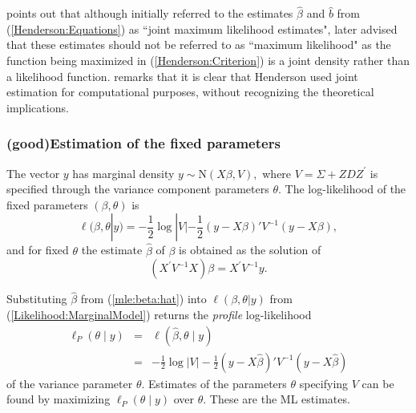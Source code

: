 \documentclass[12pt, a4paper]{report}
\theoremstyle{plain}
\theoremstyle{definition}
\theoremstyle{remark}
\begin{document}
		\cite{Robi:BLUP:1991} points out that although \cite{Henderson:1950} initially referred to the estimates $\hat{\beta}$ and $\hat{b}$ from (\ref{Henderson:Equations}) as ``joint maximum likelihood estimates", \cite{Henderson:1973} later advised that these estimates should not be referred to as ``maximum likelihood" as the function being maximized in (\ref{Henderson:Criterion}) is a joint density rather than a likelihood function. \cite{YLee} remarks that it is clear that Henderson used joint estimation for computational purposes, without recognizing the theoretical implications.
		
		
		

		
		


			\subsubsection{ (good)Estimation of the fixed parameters}
			
			The vector $y$ has marginal density $y \sim \mathrm{N}(X \beta,V),$ where $V = \Sigma + ZDZ^\prime$ is specified through the variance component parameters $\theta.$ The log-likelihood of the fixed parameters $(\beta, \theta)$ is
			\begin{equation}
			\ell (\beta, \theta|y) =
			-\frac{1}{2} \log |V| -\frac{1}{2}(y -
			X \beta)'V^{-1}(y -
			X \beta), \label{Likelihood:MarginalModel}
			\end{equation}
			and for fixed $\theta$ the estimate $\hat{\beta}$ of $\beta$ is obtained as the solution of
			\begin{equation}
			(X^\prime V^{-1}X) {\beta} = X^\prime V^{-1}y.
			\label{mle:beta:hat}
			\end{equation}
			
			Substituting $\hat{\beta}$ from (\ref{mle:beta:hat}) into $\ell(\beta, \theta|y)$ from (\ref{Likelihood:MarginalModel}) returns the \emph{profile} log-likelihood
			\begin{eqnarray*}
				\ell_P(\theta \mid y) &=& \ell(\hat{\beta}, \theta \mid y) \\
				&=& -\frac{1}{2} \log |V| -\frac{1}{2}(y - X \hat{\beta})'V^{-1}(y - X \hat{\beta})
			\end{eqnarray*}
			of the variance parameter $\theta.$ Estimates of the parameters $\theta$ specifying $V$ can be found by maximizing $\ell_P(\theta \mid y)$ over $\theta.$ These are the ML estimates.
			
\end{document}
